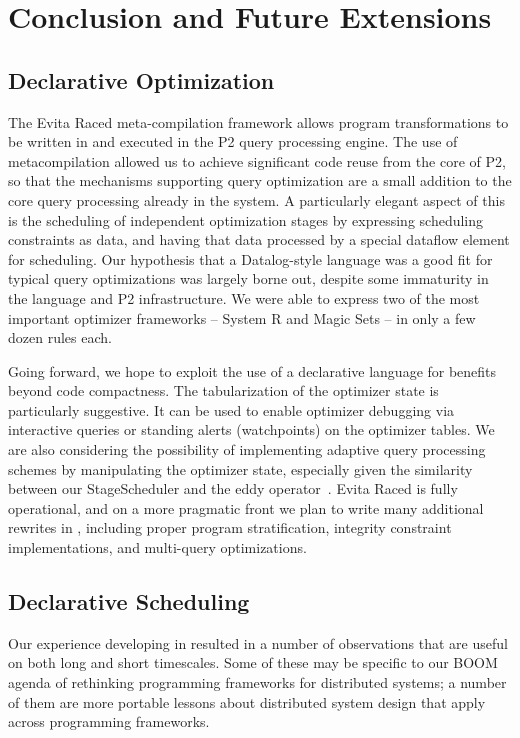 \chapter[Conclusion and Future Extensions]{Conclusion and Future Extensions}
\label{ch:conclusion}


\section{Declarative Optimization}

The Evita Raced meta-compilation framework allows \OVERLOG program transformations
to be written in \OVERLOG and executed in the P2 query processing engine. The use of 
metacompilation allowed us to achieve significant code reuse from the core of P2, so 
that the mechanisms supporting query optimization are a small addition to the core query 
processing already in the system.  A particularly elegant aspect of this is the scheduling of 
independent optimization stages by expressing scheduling constraints as data, and having 
that data processed by a special dataflow element for scheduling.  Our hypothesis that a 
Datalog-style language was a good fit for typical query optimizations was largely borne out, 
despite some immaturity in the \OVERLOG language and P2 infrastructure. We were able to 
express two of the most important optimizer frameworks -- System R and Magic Sets -- in only 
a few dozen rules each.

Going forward, we hope to exploit the use of a declarative language for benefits beyond code 
compactness.  The tabularization of the optimizer state is particularly suggestive.  It can be used 
to enable optimizer debugging via interactive queries or standing alerts (watchpoints) on the optimizer 
tables.  We are also considering the possibility of implementing adaptive query processing schemes 
by manipulating the optimizer state, especially given the similarity between our StageScheduler and 
the eddy operator~\cite{tcq-cidr}.  Evita Raced is fully operational, and on a more pragmatic front we 
plan to write many additional rewrites in \OVERLOG, including proper program stratification, integrity 
constraint implementations, and multi-query optimizations.

\section{Declarative Scheduling}

Our experience developing \BOOMA in \OVERLOG resulted in a number of observations
that are useful on both long and short timescales.  Some of these may be
specific to our BOOM agenda of rethinking programming frameworks for distributed
systems; a number of them are more portable lessons about distributed system
design that apply across programming frameworks.

